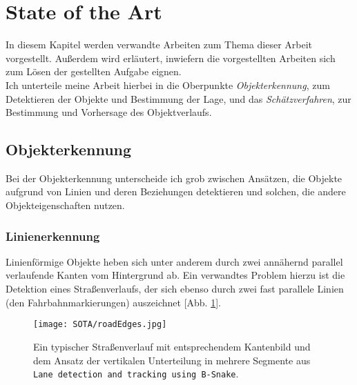 \section{State of the Art}
In diesem Kapitel werden verwandte Arbeiten zum Thema dieser Arbeit vorgestellt. Außerdem wird erläutert, inwiefern die vorgestellten Arbeiten sich zum Lösen der gestellten Aufgabe eignen.\\
Ich unterteile meine Arbeit hierbei in die Oberpunkte \textit{Objekterkennung}, zum Detektieren der Objekte und Bestimmung der Lage, und das \textit{Schätzverfahren}, zur Bestimmung und Vorhersage des Objektverlaufs.
\subsection{Objekterkennung}
Bei der Objekterkennung unterscheide ich grob zwischen Ansätzen, die Objekte aufgrund von Linien und deren Beziehungen detektieren und solchen, die andere Objekteigenschaften nutzen.
\subsubsection{Linienerkennung}
Linienförmige Objekte heben sich unter anderem durch zwei annähernd parallel verlaufende Kanten vom Hintergrund ab.
Ein verwandtes Problem hierzu ist die Detektion eines Straßenverlaufs, der sich ebenso durch zwei fast parallele Linien (den Fahrbahnmarkierungen) auszeichnet [Abb. \ref{Abb. 4}].\\
\begin{figure}[H]
	\texttt{[image: SOTA/roadEdges.jpg]}
	\caption{Ein typischer Straßenverlauf mit entsprechendem Kantenbild und dem Ansatz der vertikalen Unterteilung in mehrere Segmente aus \texttt{Lane detection and tracking using B-Snake}\cite{wang2004lane}.}
	\label{Abb. 4}
\end{figure}

